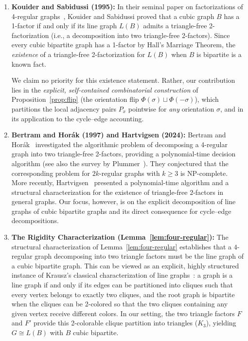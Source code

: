 \documentclass[11pt,reqno]{amsart}
\theoremstyle{definition}
\theoremstyle{remark}
\begin{document}
\begin{enumerate}[(1)]
    \item \textbf{Kouider and Sabidussi (1995):} In their seminal paper on factorizations of 4-regular graphs~\cite{KS95}, Kouider and Sabidussi proved that a cubic graph $B$ has a 1-factor if and only if its line graph $L(B)$ admits a triangle-free 2-factorization (i.e., a decomposition into two triangle-free 2-factors). Since every cubic bipartite graph has a 1-factor by Hall's Marriage Theorem, the \emph{existence} of a triangle-free 2-factorization for $L(B)$ when $B$ is bipartite is a known fact.
    
    We claim no priority for this existence statement. Rather, our contribution lies in the \emph{explicit, self-contained combinatorial construction} of Proposition~\ref{prop:flip} (the orientation flip $\Phi(\sigma) \sqcup \Phi(-\sigma)$), which partitions the local adjacency pairs $P_x$ pointwise for \emph{any} orientation $\sigma$, and in its application to the cycle--edge accounting.
    
    \item \textbf{Bertram and Hor\'ak (1997) and Hartvigsen (2024):} Bertram and Hor\'ak~\cite{BH97} investigated the algorithmic problem of decomposing a 4-regular graph into two triangle-free 2-factors, providing a polynomial-time decision algorithm (see also the survey by Plummer~\cite{Pl07}). They conjectured that the corresponding problem for $2k$-regular graphs with $k \ge 3$ is NP-complete. More recently, Hartvigsen~\cite{Hartvigsen24} presented a polynomial-time algorithm and a structural characterization for the existence of triangle-free $2$-factors in general graphs. Our focus, however, is on the explicit decomposition of line graphs of cubic bipartite graphs and its direct consequence for cycle--edge decompositions.
    
    \item \textbf{The Rigidity Characterization (Lemma~\ref{lem:four-regular}):} The structural characterization of Lemma~\ref{lem:four-regular} establishes that a $4$-regular graph decomposing into two triangle factors must be the line graph of a cubic bipartite graph. This can be viewed as an explicit, highly structured instance of Krausz's classical characterization of line graphs~\cite{Krausz43}: a graph is a line graph if and only if its edges can be partitioned into cliques such that every vertex belongs to exactly two cliques, and the root graph is bipartite when the cliques can be 2-colored so that the two cliques containing any given vertex receive different colors. In our setting, the two triangle factors $F$ and $F'$ provide this 2-colorable clique partition into triangles ($K_3$), yielding $G \cong L(B)$ with $B$ cubic bipartite.
\end{enumerate}
\end{document}
